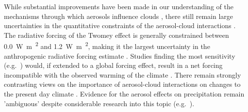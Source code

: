 
While substantial improvements have been made in our understanding of the mechanisms through which aerosols influence clouds \citep{fan_review_2016}, there still remain large uncertainties in the quantitative constraints of the aerosol-cloud interactions \citep{IPCCRadiativeForcingMyhre2013}.
The radiative forcing of the Twomey effect is generally constrained between \SI{0.0}{\watt\meter\textsuperscript{2}} and \SI{1.2}{\watt\meter\textsuperscript{2}}, making it the largest uncertainty in the anthropogenic radiative forcing estimate \citep{IPCCRadiativeForcingMyhre2013}.
Studies finding the most sensitivity (e.g.\ \citep{rosenfeld_aerosol-driven_2019}) would, if extended to a global forcing effect, result in a net forcing incompatible with the observed warming of the climate \citep{stevens_rethinking_2015}.
There remain strongly contrasting views on the importance of aerosol-cloud interactions on changes to the present day climate \citep{stevens_climate_2012}. 
Evidence for the aerosol effects on precipitation remain 'ambiguous' \citep{IPCCCloudsAeorosolsBoucher2013} despite considerable research into this topic (e.g.\ \citet{levin_aerosol_2008, tao_impact_2012}).



